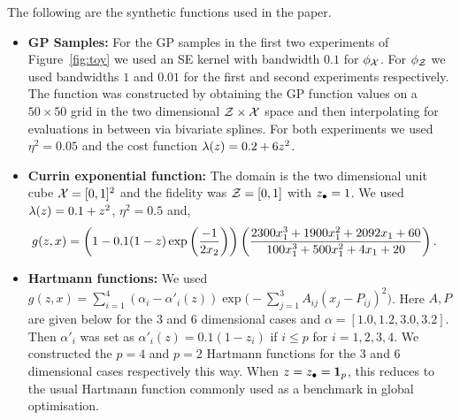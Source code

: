 The following are the synthetic functions used in the paper.
\begin{itemize}[leftmargin=0.0in]

\item[]
\textbf{GP Samples:}
For the GP samples in the first two experiments of Figure~\ref{fig:toy} we used an
SE kernel with bandwidth $0.1$ for $\phi_{\mathcal{X}}$.
For $\phi_{\mathcal{Z}}$ we used bandwidths $1$ and $0.01$ for the first and second experiments
respectively.
The function was constructed by obtaining the GP function values on a $50\times 50$ grid
in the two dimensional $\mathcal{Z}\times\mathcal{X}$ space and then interpolating for evaluations
in between via bivariate splines.
For both experiments we used $\eta^2 = 0.05$ and the cost function $\lambda(z) = 0.2 +
6z^2$.

\item[]
\textbf{Currin exponential function:}
The domain is the two dimensional unit cube $\mathcal{X} = [0,1]^2$ and the fidelity 
was $\mathcal{Z} = [0, 1]$ with $z_{\bullet} = 1$.
We used $\lambda(z) = 0.1 + z^2$, $\eta^2=0.5$ and,
\begin{align*}
g(z, x) &= \left(1-0.1(1-z)\exp\left(\frac{-1}{2x_2}\right)\right)
  \left(\frac{2300x_1^3 + 1900x_1^2 + 2092x_1 + 60}{100x_1^3 + 
  500x_1^2 + 4x_1 + 20}\right).
\end{align*}

\item[]
\textbf{Hartmann functions:}
We used 
$g(z,x) = \sum_{i=1}^4 (\alpha_i - \alpha'_i(z)) \exp\big( -\sum_{j=1}^3 A_{ij}
(x_j-P_{ij})^2\big)$.
Here $A, P$ are given below for the $3$ and $6$ dimensional cases and
$\alpha = [1.0, 1.2, 3.0, 3.2]$.
Then $\alpha'_i$ was set as $\alpha'_i(z) = 0.1(1 - z_i)$ if $i\leq p$ for
$i=1,2,3,4$.
We constructed the $p=4$ and $p=2$ Hartmann functions for the $3$ and $6$ dimensional
cases respectively this way.
When $z = z_{\bullet} = {\bf 1}_p$, this reduces to the usual Hartmann function commonly used
as a benchmark in global optimisation.


\end{itemize}
